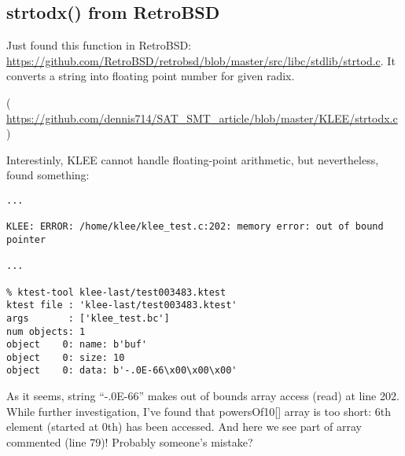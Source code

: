 \subsection{strtodx() from RetroBSD}

Just found this function in RetroBSD:
\url{https://github.com/RetroBSD/retrobsd/blob/master/src/libc/stdlib/strtod.c}.
It converts a string into floating point number for given radix.


( \url{https://github.com/dennis714/SAT_SMT_article/blob/master/KLEE/strtodx.c} )

Interestinly, KLEE cannot handle floating-point arithmetic, but nevertheless, found something:

\begin{lstlisting}
...

KLEE: ERROR: /home/klee/klee_test.c:202: memory error: out of bound pointer

...

% ktest-tool klee-last/test003483.ktest
ktest file : 'klee-last/test003483.ktest'
args       : ['klee_test.bc']
num objects: 1
object    0: name: b'buf'
object    0: size: 10
object    0: data: b'-.0E-66\x00\x00\x00'
\end{lstlisting}

As it seems, string ``-.0E-66'' makes out of bounds array access (read) at line 202.
While further investigation, I've found that powersOf10[] array is too short: 6th element (started at 0th) has been accessed.
And here we see part of array commented (line 79)!
Probably someone's mistake?


